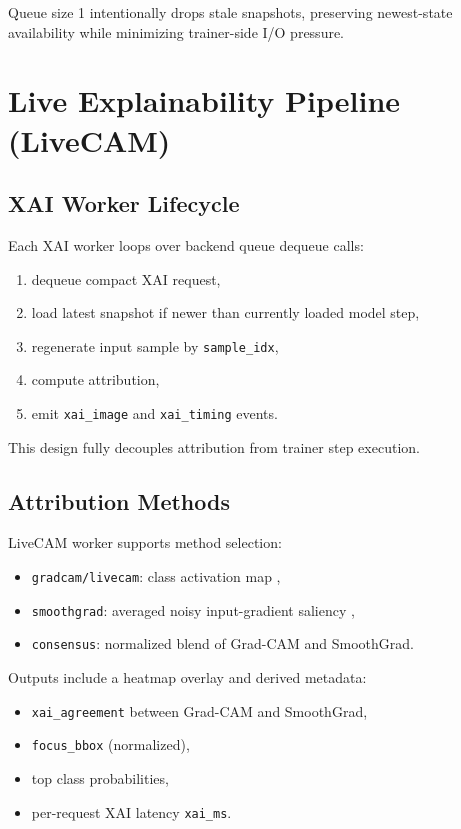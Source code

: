 \documentclass[11pt]{article}
\begin{document}
Queue size 1 intentionally drops stale snapshots, preserving newest-state availability while minimizing trainer-side I/O pressure.

\section{Live Explainability Pipeline (LiveCAM)}
\subsection{XAI Worker Lifecycle}
Each XAI worker loops over backend queue dequeue calls:
\begin{enumerate}[leftmargin=1.5em]
  \item dequeue compact XAI request,
  \item load latest snapshot if newer than currently loaded model step,
  \item regenerate input sample by \texttt{sample\_idx},
  \item compute attribution,
  \item emit \texttt{xai\_image} and \texttt{xai\_timing} events.
\end{enumerate}

This design fully decouples attribution from trainer step execution.

\subsection{Attribution Methods}
LiveCAM worker supports method selection:
\begin{itemize}[leftmargin=1.5em]
  \item \texttt{gradcam/livecam}: class activation map \cite{selvaraju2017gradcam},
  \item \texttt{smoothgrad}: averaged noisy input-gradient saliency \cite{smilkov2017smoothgrad},
  \item \texttt{consensus}: normalized blend of Grad-CAM and SmoothGrad.
\end{itemize}

Outputs include a heatmap overlay and derived metadata:
\begin{itemize}[leftmargin=1.5em]
  \item \texttt{xai\_agreement} between Grad-CAM and SmoothGrad,
  \item \texttt{focus\_bbox} (normalized),
  \item top class probabilities,
  \item per-request XAI latency \texttt{xai\_ms}.
\end{itemize}
\end{document}
